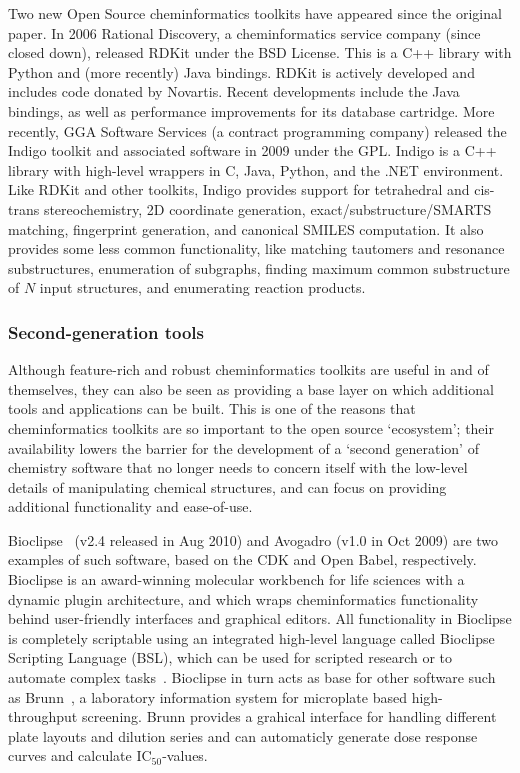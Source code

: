\documentclass[10pt]{bmc_article}
\newenvironment{bmcformat}{\begin{raggedright}\baselineskip20pt\sloppy\setboolean{publ}{false}}{\end{raggedright}\baselineskip20pt\sloppy}
\begin{document}
\begin{bmcformat}
Two new Open Source cheminformatics toolkits have appeared since the
original paper. In 2006 Rational Discovery, a cheminformatics service
company (since closed down), released RDKit \cite{WebRDKit} under the
BSD License. This is a C++ library with Python and (more recently)
Java bindings. RDKit is actively developed and includes
code donated by Novartis. Recent developments include the Java
bindings, as well as performance improvements for its database
cartridge. More recently, GGA Software Services
(a contract programming company)
released the Indigo toolkit \cite{WebIndigo} and associated software
in 2009 under the GPL. Indigo is a C++ library with
high-level wrappers in C, Java, Python, and the .NET
environment. Like RDKit and other toolkits, Indigo provides support for
tetrahedral and cis-trans stereochemistry, 2D coordinate generation,
exact/substructure/SMARTS matching, fingerprint generation, and
canonical SMILES computation.
It also provides some less common functionality, like matching
tautomers and resonance substructures, enumeration of subgraphs,
finding maximum common substructure of $N$ input structures, and
enumerating reaction products.

\subsubsection*{Second-generation tools}

Although feature-rich and robust cheminformatics toolkits are useful
in and of themselves, they can also be seen as providing a base layer
on which additional tools and applications can be built. This is one
of the reasons that cheminformatics toolkits are so important to the
open source `ecosystem'; their availability lowers the barrier for the
development of a `second generation' of chemistry software that no
longer needs to concern itself with the low-level details of
manipulating chemical structures, and can focus on providing
additional functionality and ease-of-use.

Bioclipse~\cite{Spjuth:2007fk} (v2.4 released in Aug 2010) and Avogadro
\cite{WebAvogadro} (v1.0 in Oct 2009) are two examples of such software, based
on the CDK and Open Babel, respectively. Bioclipse is an award-winning
molecular workbench for life sciences with a dynamic plugin architecture, and
which wraps cheminformatics functionality behind user-friendly interfaces and
graphical editors. All functionality in Bioclipse is completely scriptable
using an integrated high-level language called Bioclipse Scripting Language
(BSL), which can be used for scripted research or to automate complex
tasks~\cite{Bioclipse2}. Bioclipse in turn acts as base for other software
such as Brunn~\cite{WebBrunn}, a laboratory information system for
microplate based high-throughput screening. Brunn provides a grahical interface
for handling different plate layouts and dilution series and can automaticly
generate dose response curves and calculate IC$_{50}$-values.


\end{bmcformat}
\end{document}
